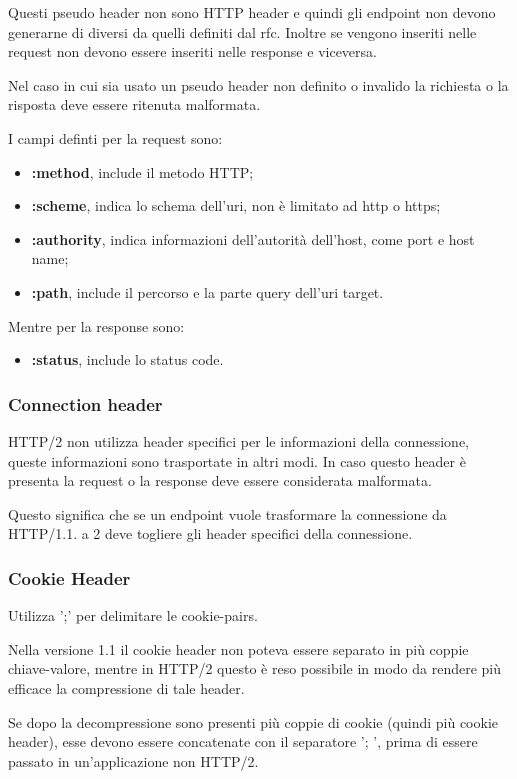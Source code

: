\documentclass[12pt, a4paper]{article} %
\begin{document}
Questi pseudo header non sono HTTP header e quindi gli endpoint non devono generarne di diversi da quelli definiti dal rfc.
Inoltre se vengono inseriti nelle request non devono essere inseriti nelle response e viceversa.

Nel caso in cui sia usato un pseudo header non definito o invalido la richiesta o la risposta deve essere ritenuta malformata.

I campi definti per la request sono:
\begin{itemize}
    \item \textbf{:method}, include il metodo HTTP;
    \item \textbf{:scheme}, indica lo schema dell'uri, non è limitato ad http o https;
    \item \textbf{:authority}, indica informazioni dell'autorità dell'host, come port e host name;
    \item \textbf{:path}, include il percorso e la parte query dell'uri target.
\end{itemize}

Mentre per la response sono:
\begin{itemize}
    \item \textbf{:status}, include lo status code.
\end{itemize}

\subsubsection{Connection header}
HTTP/2 non utilizza header specifici per le informazioni della connessione, queste informazioni sono trasportate in altri modi. In caso questo header è presenta la request o la response deve essere considerata malformata.

Questo significa che se un endpoint vuole trasformare la connessione da HTTP/1.1. a 2 deve togliere gli header specifici della connessione.

\subsubsection{Cookie Header}
Utilizza ';' per delimitare le cookie-pairs.

Nella versione 1.1 il cookie header non poteva essere separato in più coppie chiave-valore, mentre in HTTP/2 questo è reso possibile in modo da rendere più efficace la compressione di tale header.

Se dopo la decompressione sono presenti più coppie di cookie (quindi più cookie header), esse devono essere concatenate con il separatore '; ', prima di essere passato in un'applicazione non HTTP/2.
\end{document}
